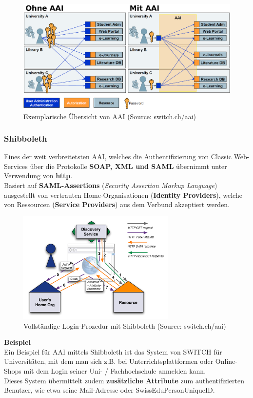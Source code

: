 \begin{figure}[H]
	\centering
	\includegraphics[width=\textwidth]{./img/AAI-example}
	\caption{Exemplarische Übersicht von AAI (Source: switch.ch/aai)}
\end{figure}

\subsubsection{Shibboleth}
Eines der weit verbreitetsten AAI, welches die Authentifizierung von Classic Web-Services über die Protokolle \textbf{SOAP, XML und SAML} übernimmt unter Verwendung von \textbf{http}.\\
Basiert auf \textbf{SAML-Assertions} (\textit{Security Assertion Markup Language}) ausgestellt von vertrauten Home-Organisationen (\textbf{Identity Providers}), welche von Ressourcen (\textbf{Service Providers}) aus dem Verbund akzeptiert werden.

\begin{figure}[H]
	\centering
	\includegraphics[width=0.7\textwidth]{./img/shibboleth-login}
	\caption{Vollständige Login-Prozedur mit Shibboleth (Source: switch.ch/aai)}
\end{figure}

\textbf{Beispiel}\\
Ein Beispiel für AAI mittels Shibboleth ist das System von SWITCH für Universitäten, mit dem man sich z.B. bei Unterrichtsplattformen oder Online-Shops mit dem Login seiner Uni- / Fachhochschule anmelden kann.\\
Dieses System übermittelt zudem \textbf{zusätzliche Attribute} zum authentifizierten Benutzer, wie etwa seine Mail-Adresse oder SwissEduPersonUniqueID.\\

